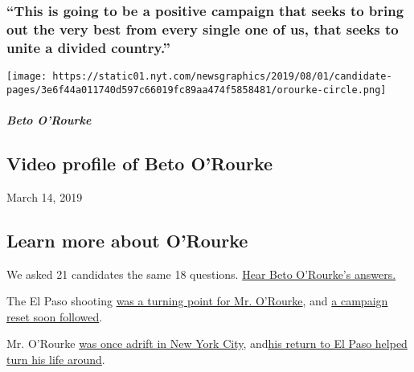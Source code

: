 \hypertarget{this-is-going-to-be-a-positive-campaign-that-seeks-to-bring-out-the-very-best-from-every-single-one-of-us-that-seeks-to-unite-a-divided-country}{%
\subsubsection{``This is going to be a positive campaign that seeks to
bring out the very best from every single one of us, that seeks to unite
a divided
country.''}\label{this-is-going-to-be-a-positive-campaign-that-seeks-to-bring-out-the-very-best-from-every-single-one-of-us-that-seeks-to-unite-a-divided-country}}

\texttt{[image: https://static01.nyt.com/newsgraphics/2019/08/01/candidate-pages/3e6f44a011740d597c66019fc89aa474f5858481/orourke-circle.png]}

\hypertarget{beto-orourke-1}{%
\subparagraph{Beto O'Rourke}\label{beto-orourke-1}}

\hypertarget{video-profile-of-beto-orourke}{%
\subsection{Video profile of Beto
O'Rourke}\label{video-profile-of-beto-orourke}}

March 14, 2019

\hypertarget{learn-more-about-orourke}{%
\subsection{Learn more about O'Rourke}\label{learn-more-about-orourke}}

We asked 21 candidates the same 18 questions.
\href{https://www.nytimes.com/interactive/2019/us/politics/beto-o-rourke-2020-campaign.html}{Hear
Beto O'Rourke's answers.}

The El Paso shooting
\href{https://www.nytimes.com/2019/08/11/us/politics/el-paso-shooting-beto-o-rourke.html}{was
a turning point for Mr. O'Rourke}, and
\href{https://www.nytimes.com/2019/08/15/us/politics/beto-orourke-2020-trump.html}{a
campaign reset soon followed}.

Mr. O'Rourke
\href{https://www.nytimes.com/2019/02/06/us/politics/beto-orourke-president.html}{was
once adrift in New York City},
and\href{https://www.nytimes.com/2019/04/26/us/politics/beto-o-rourke-el-paso-texas.html}{}\href{https://www.nytimes.com/2019/04/26/us/politics/beto-o-rourke-el-paso-texas.html}{his
return to El Paso helped turn his life around}.

